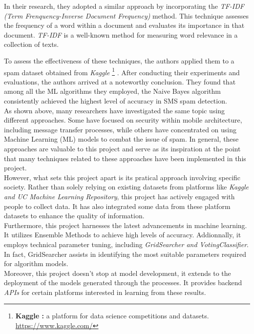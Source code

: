 \documentclass[12pt,a4paper]{report}
\begin{document}
	In their research, they adopted a similar approach by incorporating the \textit{TF-IDF (Term Frenquency-Inverse Document Frequency)} method. This technique assesses the frequency of a word within a document and evaluates its importance in that document. \textit{TF-IDF} is a well-known method for measuring word relevance in a collection of texts.
	
	To assess the effectiveness of these techniques, the authors applied them to a spam dataset obtained from \textit{Kaggle} 
	\footnote{ \textbf{Kaggle :} a platform for data science competitions and datasets. \url{https://www.kaggle.com/}}
	. After conducting their experiments and evaluations, the authors arrived at a noteworthy conclusion. They found that among all the ML algorithms they employed, the Naive Bayes algorithm consistently achieved the highest level of accuracy in SMS spam detection.\\
	
	As shown above, many researchers have investigated the same topic using different approaches. Some have focused on security within mobile architecture, including message transfer processes, while others have concentrated on using Machine Learning (ML) models to combat the issue of spam. In general, these approaches are valuable to this project and serve as its inspiration at the point that many techniques related to these approaches have been implemented in this project.\\

    However, what sets this project apart is its pratical approach involving specific society. Rather than solely relying on existing datasets from platforms like \textit{Kaggle and UC Machine Learning Repository}, this project has actively engaged with people to collect data. It has also integrated some data from these platform datasets to enhance the quality of information. \\
        
    Furthermore, this project harnesses the latest advancements in machine learning. It utilizes Ensemble Methods to achieve high levels of accuracy. Addionnally, it employs technical parameter tuning, including \textit{GridSearcher and VotingClassifier}. In fact, GridSearcher assists in identifying the most suitable parameters required for algorithm models.  
    \\
    
    Moreover, this project doesn't stop at model development, it extends to the deployment of the models generated through the processes. It provides backend \textit{APIs} for certain platforms interested in learning from these results. 
    
\end{document}

